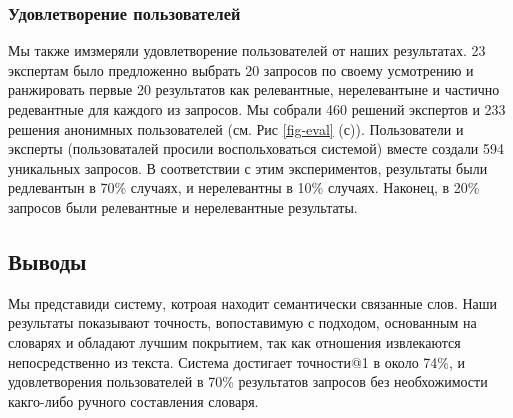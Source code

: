 \documentclass[a4paper,10pt,twoside]{article}
\begin{document}
\subsubsection{Удовлетворение пользователей} Мы также имзмеряли удовлетворение пользователей от наших результатах. 23 экспертам было предложенно выбрать 20 запросов по своему усмотрению и ранжировать первые 20 результатов как релевантные, нерелевантыне и частично редевантные для каждого из запросов. Мы собрали 460 решений экспертов и 233 решения анонимных пользователей (см. Рис \ref{fig-eval} (с)). Пользователи и эксперты (пользоваталей просили воспольховаться системой) вместе создали 594 уникальных запросов. В соответствии с этим экспериментов, результаты были редлевантын  в 70\% случаях, и нерелевантны в 10\% случаях. Наконец, в 20\% запросов были релевантные и нерелевантные результаты.

\subsection{Выводы}

Мы представиди систему, котроая находит семантически связанные слов. Наши результаты показывают точность, вопоставимую с подходом, основанным на словарях и обладают лучшим покрытием, так как отношения извлекаются непосредственно из текста. Система достигает точности@1 в около 74\%, и удовлетворения пользователей в 70\% результатов запросов без необхожимости какго-либо ручного составления словаря.




\end{document}
